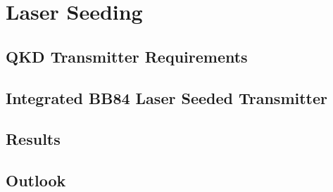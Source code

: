 %
%
\let\textcircled=\pgftextcircled
\chapter{Laser Seeding}
\label{chap:laser-seeding}

\section{QKD Transmitter Requirements}
\label{sec:sec06}

\section{Integrated BB84 Laser Seeded Transmitter}

\section{Results}

\section{Outlook}


